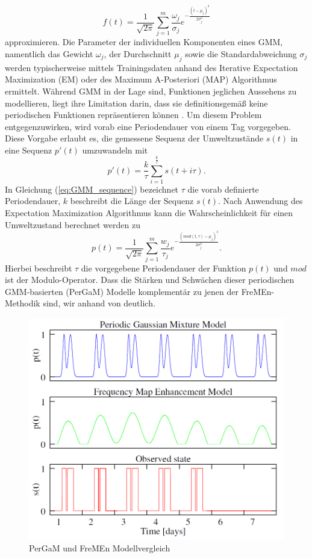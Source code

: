 \begin{equation}
	f(t) = \frac{1}{\sqrt{2 \pi}} \sum_{j=1}^{m} \frac{\omega_j}{\sigma_j} e^{- \frac{(t- \mu_j)^2}{2 \sigma_j ^2}}
	\label{eq:Gaussian_Mixture_Models}
\end{equation}
approximieren.
Die Parameter der individuellen Komponenten eines GMM, namentlich das Gewicht $\omega_j$, der Durchschnitt $\mu_j$ sowie die Standardabweichung $\sigma_j$ werden typischerweise mittels Trainingsdaten anhand des Iterative Expectation Maximization (EM) oder des Maximum A-Posteriori (MAP) Algorithmus ermittelt. Während GMM in der Lage sind, Funktionen jeglichen Aussehens zu modellieren, liegt ihre Limitation darin, dass sie definitionsgemäß keine periodischen Funktionen repräsentieren können \cite{Krajnik.2015b}. Um diesem Problem entgegenzuwirken, wird vorab eine Periodendauer von einem Tag vorgegeben. Diese Vorgabe erlaubt es, die gemessene Sequenz der Umweltzustände $s(t)$  in eine Sequenz $p'(t)$ umzuwandeln mit
\begin{equation}
	p'(t) = \frac{k}{\tau} \sum_{i=1}^{\frac{k}{\tau}} s(t+i \tau) .
	\label{eq:GMM_sequence}
\end{equation}
In Gleichung (\ref{eq:GMM_sequence}) bezeichnet $\tau$ die vorab definierte Periodendauer, $k$ beschreibt die Länge der Sequenz $s(t)$. Nach Anwendung des Expectation Maximization Algorithmus kann die Wahrscheinlichkeit für einen Umweltzustand berechnet werden zu
\begin{equation}
	p(t) = \frac{1}{\sqrt{2 \pi}} \sum_{j=1}^{m} \frac{w_j}{\tau_j} e ^{- \frac{(mod(t,\tau) - \mu_j)^2}{2 \sigma_j^2}} .
	\label{eq:Gauss_Probability}
\end{equation}
Hierbei beschreibt $\tau$ die vorgegebene Periodendauer der Funktion $p(t)$ und $mod$ ist der Modulo-Operator. Dass die Stärken und Schwächen dieser periodischen GMM-basierten (PerGaM) Modelle komplementär zu jenen der FreMEn-Methodik sind, wir anhand von  deutlich.
\begin{figure}[!ht]
	\begin{center}
		\includegraphics[width=0.7\linewidth]{Abbildungen/stand_der_technik/PerGaM_vs_FreMEn}
		\caption{PerGaM und FreMEn Modellvergleich\, \cite{Krajnik.2015b}}
		\label{fig.PerGaM_vs_FreMEn}
	\end{center}
\end{figure}
